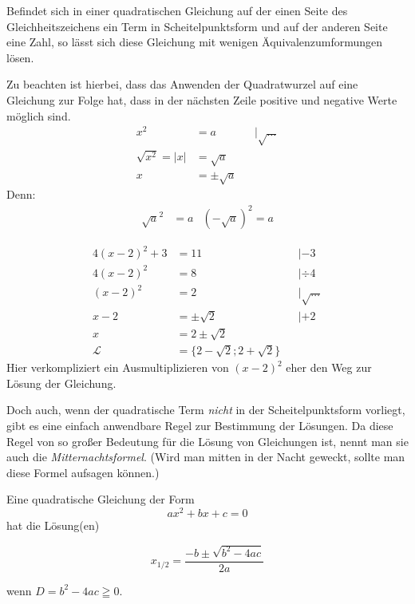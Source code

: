 \begin{regel}
 Befindet sich in einer quadratischen Gleichung auf der einen Seite des Gleichheitszeichens ein Term in Scheitelpunktsform und auf der anderen Seite eine Zahl, so lässt sich diese Gleichung mit wenigen Äquivalenzumformungen lösen.
 
 Zu beachten ist hierbei, dass das Anwenden der Quadratwurzel auf eine Gleichung zur Folge hat, dass in der nächsten Zeile positive und negative Werte möglich sind.
 \begin{align*}
  x^2 &= a &&|\sqrt{\ldots}\\
  \sqrt{x^2} = |x| &= \sqrt{a} \\
  x &= \pm \sqrt{a}
 \end{align*}
 Denn:
 \begin{align*}
  \sqrt{a}^2 &= a & \left(-\sqrt{a}\right)^2 = a 
 \end{align*}

\end{regel}

\begin{bsp}
 \begin{align*}
  4(x-2)^2 +3&= 11 && | -3\\
  4(x-2)^2 &= 8 && | \div 4\\
  (x-2)^2 &= 2 && | \sqrt{\ldots} \\
  x-2 &= \pm \sqrt{2} && | +2 \\
  x &= 2 \pm \sqrt{2} \\
  \mathcal{L} &= \lbrace 2-\sqrt{2}; 2+\sqrt{2}\rbrace
 \end{align*}
 Hier verkompliziert ein Ausmultiplizieren von \((x-2)^2\) eher den Weg zur Lösung der Gleichung.
\end{bsp}

Doch auch, wenn der quadratische Term \emph{nicht} in der Scheitelpunktsform vorliegt, gibt es eine einfach anwendbare Regel zur Bestimmung der Lösungen. Da diese Regel von so großer Bedeutung für die Lösung von Gleichungen ist, nennt man sie auch die \emph{Mitternachtsformel}. (Wird man mitten in der Nacht geweckt, sollte man diese Formel aufsagen können.)

\begin{ssatz}
 Eine quadratische Gleichung der Form
 \begin{equation*}
  ax^2+bx+c =0
 \end{equation*}
 hat die Lösung(en)
 \begin{blockwhitebox}
 \begin{equation*}  x_{1/2} = \frac{-b\pm \sqrt{b^2-4ac}}{2a} 
 \end{equation*}
 \end{blockwhitebox}
 wenn \(D = b^2-4ac \geqq 0\).

\end{ssatz}

